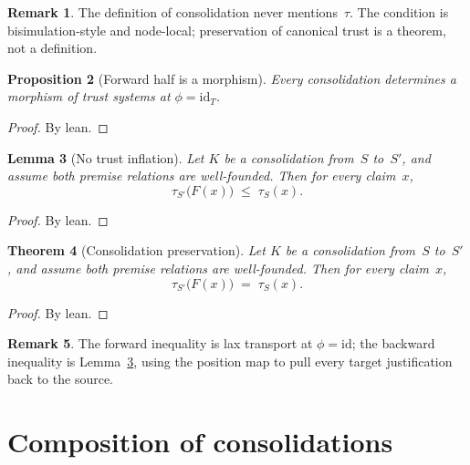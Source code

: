 \documentclass[11pt,a4paper]{article}
\theoremstyle{plain}
\newtheorem{theorem}{Theorem}[section]
\newtheorem{proposition}[theorem]{Proposition}
\newtheorem{lemma}[theorem]{Lemma}
\theoremstyle{definition}
\newtheorem{remark}[theorem]{Remark}
\newcommand{\tauCan}{\tau}
\begin{document}
\begin{remark}
The definition of consolidation never mentions~$\tau$. The condition is
bisimulation-style and node-local; preservation of canonical trust is a
theorem, not a definition.
\end{remark}

\begin{proposition}[Forward half is a morphism]\label{prop:to-mor}
Every consolidation determines a morphism of trust systems at
$\phi = \mathrm{id}_T$.
\end{proposition}

\begin{proof}
By lean.
\end{proof}

\begin{lemma}[No trust inflation]\label{lem:tau-le}
Let $K$ be a consolidation from~$S$ to~$S'$, and assume both premise
relations are well-founded. Then for every claim~$x$,
\[
  \tauCan_{S'}\bigl(F(x)\bigr)
  \;\le\;
  \tauCan_S(x).
\]
\end{lemma}

\begin{proof}
By lean.
\end{proof}

\begin{theorem}[Consolidation preservation]\label{thm:tau-consolidate}
Let $K$ be a consolidation from~$S$ to~$S'$, and assume both premise
relations are well-founded. Then for every claim~$x$,
\begin{equation}
  \tauCan_{S'}\bigl(F(x)\bigr)
  \;=\;
  \tauCan_S(x).
\end{equation}
\end{theorem}

\begin{proof}
By lean.
\end{proof}

\begin{remark}
The forward inequality is lax transport at $\phi = \mathrm{id}$; the
backward inequality is Lemma~\ref{lem:tau-le}, using the position map to
pull every target justification back to the source.
\end{remark}

\section{Composition of consolidations}
\end{document}
